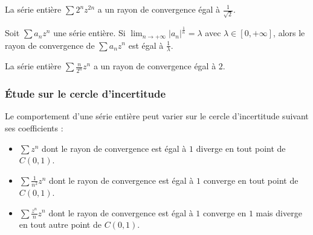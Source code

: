 	\begin{example}
		La série entière $\sum 2^n z^{2n}$ a un rayon de convergence égal à $\frac{1}{\sqrt{2}}$.
	\end{example}
	
	\begin{corollary}
		Soit $\sum a_n z^n$ une série entière. Si $\lim_{n \rightarrow +\infty} \left| a_n \right|^{\frac{1}{n}} = \lambda$ avec $\lambda \in [0, +\infty]$, alors le rayon de convergence de $\sum a_n z^n$ est égal à $\frac{1}{\lambda}$.
	\end{corollary}
	
	\begin{example}
		La série entière $\sum \frac{n}{2^n} z^n$ a un rayon de convergence égal à $2$.
	\end{example}
	
	\subsubsection{Étude sur le cercle d'incertitude}
	
	
	\begin{example}
		Le comportement d'une série entière peut varier sur le cercle d'incertitude suivant ses coefficients :
		\begin{itemize}
			\item $\sum z^n$ dont le rayon de convergence est égal à $1$ diverge en tout point de $C(0,1)$.
			\item $\sum \frac{1}{n^2} z^n$ dont le rayon de convergence est égal à $1$ converge en tout point de $C(0,1)$.
			\item $\sum \frac{z^n}{n} z^n$ dont le rayon de convergence est égal à $1$ converge en $1$ mais diverge en tout autre point de $C(0,1)$.
		\end{itemize}
	\end{example}


